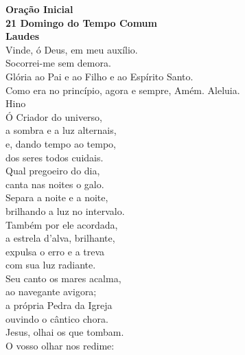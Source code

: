 \documentclass{book}
\begin{document}

\newpage
\begin{center}
    \textbf{Oração Inicial}
    \vspace{.2cm} \\
    \textcolor{VioletRed2}{\textbf{21\textordmasculine{} Domingo do Tempo Comum}}
    \vspace{.2cm} \\
    \textbf{Laudes}
    \vspace{.2cm} \\
    \VbarRed{} Vinde, ó Deus, em meu auxílio. \\
    \RbarRed{} Socorrei-me sem demora. \\
    Glória ao Pai e ao Filho e ao Espírito Santo.\ \textsuperscript{\gresixstar{}} \\
    Como era no princípio, agora e sempre, Amém. Aleluia.
    \vspace{.2cm} \\
    \textcolor{VioletRed2}{Hino}
    \vspace{.2cm} \\
    Ó Criador do universo, \\
    a sombra e a luz alternais, \\
    e, dando tempo ao tempo, \\
    dos seres todos cuidais.
    \vspace{.2cm} \\
    Qual pregoeiro do dia, \\
    canta nas noites o galo. \\
    Separa a noite e a noite, \\
    brilhando a luz no intervalo.
    \vspace{.2cm} \\
    Também por ele acordada, \\
    a estrela d'alva, brilhante, \\
    expulsa o erro e a treva \\
    com sua luz radiante.
    \vspace{.2cm} \\
    Seu canto os mares acalma, \\
    ao navegante avigora; \\
    a própria Pedra da Igreja \\
    ouvindo o cântico chora.
    \vspace{.2cm} \\
    Jesus, olhai os que tombam. \\
    O vosso olhar nos redime: \\

\end{center}
\end{document}
